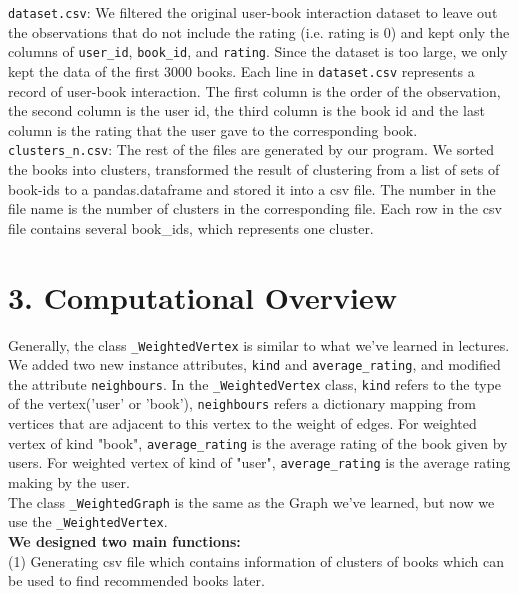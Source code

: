 \documentclass[fontsize=11pt]{article}
\begin{document}
\texttt{dataset.csv}: We filtered the original user-book interaction dataset to leave out the observations that do not include the rating (i.e. rating is 0) and kept only the columns of \texttt{user\_id}, \texttt{book\_id}, and \texttt{rating}. Since the dataset is too large, we only kept the data of the first 3000 books. Each line in \texttt{dataset.csv} represents a record of user-book interaction. The first column is the order of the observation, the second column is the user id, the third column is the book id and the last column is the rating that the user gave to the corresponding book. \\

\texttt{clusters\_n.csv}: The rest of the files are generated by our program. We sorted the books into clusters, transformed the result of clustering from a list of sets of book-ids to a pandas.dataframe and stored it into a csv file. The number in the file name is the number of clusters in the corresponding file. Each row in the csv file contains several book\_ids, which represents one cluster.


\section*{3. Computational Overview }
Generally, the class \texttt{\_WeightedVertex} is similar to what we've learned in lectures. We added two new instance attributes, \texttt{kind} and \texttt{average\_rating}, and modified the attribute \texttt{neighbours}. In the \texttt{\_WeightedVertex} class, \texttt{kind} refers to the type of the vertex('user' or 'book'), \texttt{neighbours} refers a dictionary mapping from  vertices that are adjacent to this vertex to the weight of edges. For weighted vertex of kind "book",  \texttt{average\_rating} is the average rating of the book given by users. For weighted vertex of kind of "user", \texttt{average\_rating} is the average rating making by the user.\\

The class \texttt{\_WeightedGraph} is the same as the Graph we've learned, but now we use the \texttt{\_WeightedVertex}.\\

\textbf{We designed two main functions:}\\

(1) Generating csv file which contains information of clusters of books which can be used to find recommended books later.\\
\end{document}
